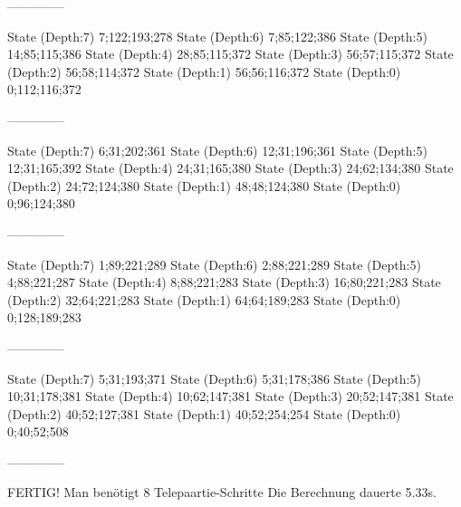 \documentclass[a4paper,10pt,ngerman]{scrartcl}
\begin{document}


\begin{lstcs}
--------------

State (Depth:7) {7;122;193;278}
State (Depth:6) {7;85;122;386}
State (Depth:5) {14;85;115;386}
State (Depth:4) {28;85;115;372}
State (Depth:3) {56;57;115;372}
State (Depth:2) {56;58;114;372}
State (Depth:1) {56;56;116;372}
State (Depth:0) {0;112;116;372}

--------------

State (Depth:7) {6;31;202;361}
State (Depth:6) {12;31;196;361}
State (Depth:5) {12;31;165;392}
State (Depth:4) {24;31;165;380}
State (Depth:3) {24;62;134;380}
State (Depth:2) {24;72;124;380}
State (Depth:1) {48;48;124;380}
State (Depth:0) {0;96;124;380}

--------------

State (Depth:7) {1;89;221;289}
State (Depth:6) {2;88;221;289}
State (Depth:5) {4;88;221;287}
State (Depth:4) {8;88;221;283}
State (Depth:3) {16;80;221;283}
State (Depth:2) {32;64;221;283}
State (Depth:1) {64;64;189;283}
State (Depth:0) {0;128;189;283}

--------------

State (Depth:7) {5;31;193;371}
State (Depth:6) {5;31;178;386}
State (Depth:5) {10;31;178;381}
State (Depth:4) {10;62;147;381}
State (Depth:3) {20;52;147;381}
State (Depth:2) {40;52;127;381}
State (Depth:1) {40;52;254;254}
State (Depth:0) {0;40;52;508}

--------------


FERTIG!
Man benötigt 8 Telepaartie-Schritte
Die Berechnung dauerte 5.33s.
\end{lstcs}
\end{document}
